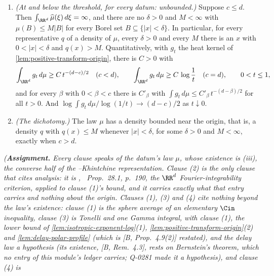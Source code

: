 \begin{theorem}
\begin{enumerate}
\[   = \frac{(2\pi)^{-d/2}}{\Gamma(d/2)}\int_0^\infty \sigma^{d/2-1}e^{-F_{\mathrm I}(\sigma)}\,d\sigma ,
\]
finite exactly when $c > d$. If $c \le d$, then for every representative $q$ of $\mu$'s
density, every $\delta > 0$ and every $M$ there is an $x$ with $0 < |x| < \delta$ and
$q(x) > M$: no representative is bounded near the origin.
\item \emph{(At and below the threshold, for every datum: unbounded.)} Suppose $c \le d$. Then
$\int_{\RR^d}\widehat\mu(\xi)\,d\xi = \infty$, and there are no $\delta > 0$ and $M < \infty$ with
$\mu(B) \le M|B|$ for every Borel set $B \subseteq \{|x| < \delta\}$. In particular, for every
representative $q$ of a density of $\mu$, every $\delta > 0$ and every $M$ there is an $x$ with
$0 < |x| < \delta$ and $q(x) > M$. Quantitatively, with $g_t$ the heat kernel of
\ref{lem:positive-transform-origin}, there is $C > 0$ with
\[
  \int_{\RR^d} g_t\,d\mu \ge C\,t^{-(d-c)/2} \quad (c < d), \qquad
  \int_{\RR^d} g_t\,d\mu \ge C\,\log\frac1t \quad (c = d), \qquad 0 < t \le 1 ,
\]
and for every $\beta$ with $0 < \beta < c$ there is $C'_\beta$ with
$\int g_t\,d\mu \le C'_\beta\,t^{-(d-\beta)/2}$ for all $t > 0$. And
$\log\int g_t\,d\mu / \log(1/t) \to (d-c)/2$ as $t \downarrow 0$.
\item \emph{(The dichotomy.)} The law $\mu$ has a density bounded near the origin, that is, a
density $q$ with $q(x) \le M$ whenever $|x| < \delta$, for some $\delta > 0$ and $M < \infty$,
exactly when $c > d$.
\end{enumerate}
\statusA\quad{}\quad{}\quad\emph{(\textbf{Assignment.} Every clause
speaks of the datum's law $\mu$, whose existence is (iii), the converse half of the
\Levy--Khintchine representation. Clause (2) is the only clause that cites analysis: it is
, ~Prop.~28.1, p.~190, the $\RR^d$ Fourier-integrability
criterion, applied to clause (1)'s bound, and it carries exactly what that entry carries and
nothing about the origin. Clauses (1), (3) and (4) cite nothing beyond the law's existence:
clause (1) is the sphere average of an elementary $\Cin$ inequality, clause (3) is Tonelli and one
Gamma integral, with clause (1), the lower bound of \ref{lem:isotropic-exponent-log}(1),
\ref{lem:positive-transform-origin}(2) and \ref{lem:delay-polar-profile} (which is
[B, Prop.~4.9(2)] restated), and the delay law a hypothesis (its
existence, [B, Rem.~4.3], rests on Bernstein's theorem, which no entry of this module's ledger
carries; Q-0281 made it a hypothesis), and clause (4) is
}
\end{theorem}
